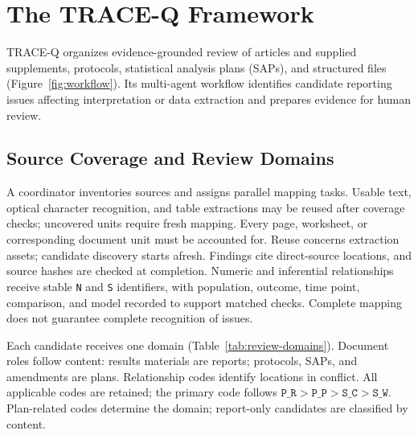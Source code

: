 \documentclass[12pt,a4paper]{article}
\begin{document}


\section{The TRACE-Q Framework}
\label{sec:framework}

TRACE-Q organizes evidence-grounded review of articles and supplied supplements, protocols, statistical analysis plans (SAPs), and structured files (Figure~\ref{fig:workflow}). Its multi-agent workflow identifies candidate reporting issues affecting interpretation or data extraction and prepares evidence for human review.

\subsection{Source Coverage and Review Domains}
\label{sec:framework-evidence}
\label{sec:framework-domains}

A coordinator inventories sources and assigns parallel mapping tasks. Usable text, optical character recognition, and table extractions may be reused after coverage checks; uncovered units require fresh mapping. Every page, worksheet, or corresponding document unit must be accounted for. Reuse concerns extraction assets; candidate discovery starts afresh. Findings cite direct-source locations, and source hashes are checked at completion. Numeric and inferential relationships receive stable \texttt{N} and \texttt{S} identifiers, with population, outcome, time point, comparison, and model recorded to support matched checks. Complete mapping does not guarantee complete recognition of issues.

Each candidate receives one domain (Table~\ref{tab:review-domains}). Document roles follow content: results materials are reports; protocols, SAPs, and amendments are plans. Relationship codes identify locations in conflict. All applicable codes are retained; the primary code follows \(\texttt{P\_R}>\texttt{P\_P}>\texttt{S\_C}>\texttt{S\_W}\). Plan-related codes determine the domain; report-only candidates are classified by content.
\end{document}
